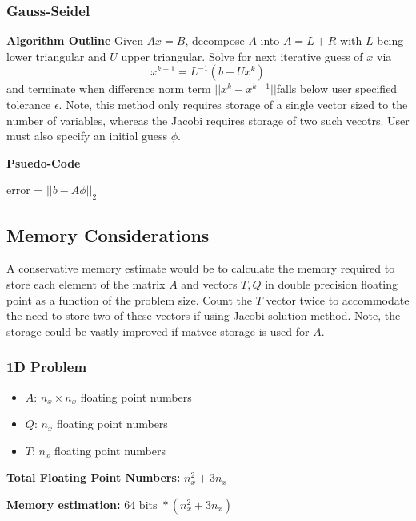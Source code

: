 \documentclass[letterpaper,12pt]{article}
\begin{document}
\subsubsection{Gauss-Seidel}
\textbf{Algorithm Outline}
Given $Ax=B$, decompose $A$ into $A = L + R$ with $L$ being lower triangular and $U$ upper triangular. Solve for next iterative guess of $x$ via
\begin{equation}
\label{Gauss-Seidal}
x^{k+1} = L^{-1} (b - Ux^k)
\end{equation}
and terminate when difference norm term $||x^{k} - x^{k-1}||$falls below user specified tolerance $\epsilon$. Note, this method only requires storage of a single vector sized to the number of variables, whereas the Jacobi requires storage of two such vecotrs. User must also specify an initial guess $\phi$.

\textbf{Psuedo-Code}

\begin{algorithm}[H]
error = $||b - A \phi||_2$ \;
\end{algorithm}
\subsection{Memory Considerations}
A conservative memory estimate would be to calculate the memory required to store each element of the matrix $A$ and vectors $T, Q$ in double precision floating point as a function of the problem size. Count the $T$ vector twice to accommodate the need to store two of these vectors if using Jacobi solution method. Note, the storage could be vastly improved if matvec storage is used for $A$.

\subsubsection{1D Problem}
\begin{itemize}
\item $A$: $n_x \times n_x$ floating point numbers
\item $Q$: $n_x$ floating point numbers
\item $T$: $n_x$ floating point numbers
\end{itemize}
\textbf{Total Floating Point Numbers:} $n_x^2 + 3 n_x$

\textbf{Memory estimation:} $64 \text{ bits } * (n_x^2 + 3 n_x)$  
\end{document}
